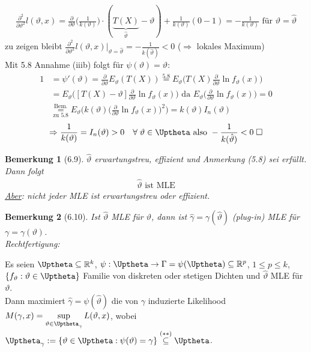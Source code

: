 \documentclass[a4paper,openany]{book}
\theoremstyle{mytheoremstyle}
\newtheorem*{bem}{Bemerkung}
\theoremstyle{mytheoremstyle2}
\newtheorem*{cbew}{Beweis}
\newenvironment{bew}[1][]{%
  \ifthenelse{\boolean{showbew}}{%
    \begin{cbew}[#1]%
  }{%
    \expandafter\comment%
  }%
}{%
  \ifthenelse{\boolean{showbew}}{%
    \end{cbew}%
  }{%
    \expandafter\endcomment%
  }%
}
\begin{document}
\begin{bew}[]
\begin{align*}
    \frac{\partial ^2}{\partial \vartheta ^2}l(\vartheta ,x)=\frac{\partial }{\partial \vartheta }\bigg(\frac{1}{k(\vartheta )}\bigg)\cdot (\underbrace{T(X)}_{\hat{\vartheta }}-\vartheta )+\frac{1}{k(\vartheta )}(0-1)=-\frac{1}{k(\vartheta )}  \text{ für }\vartheta =\hat{\vartheta }
  \end{align*}
  zu zeigen bleibt $\frac{\partial ^2}{\partial \vartheta ^2}l(\vartheta ,x)\bigg|_{\vartheta =\hat{\vartheta }}=-\frac{1}{k(\hat{\vartheta })}<0 $ ($\Rightarrow  $ lokales Maximum) \\
  Mit 5.8 Annahme (iiib) folgt für $\psi (\vartheta )=\vartheta  $:
  \begin{align*}
    1&=\psi '(\vartheta )=\frac{\partial }{\partial \vartheta }E _{\vartheta }(T(X))\overset{5.8}=E _{\vartheta }\bigg(T(X)\frac{\partial }{\partial \vartheta }\ln f _{\vartheta }(x)\bigg)\\
     &=E _{\vartheta }\bigg([T(X)-\vartheta ]\frac{\partial }{\partial \vartheta }\ln f _{\vartheta }(x)\bigg)\text{ da }E _{\vartheta }\bigg(\frac{\partial }{\partial \vartheta }\ln f _{\vartheta }(x)\bigg)=0 \\
     &\!\!\!\!\overset{\text{Bem.}}{\underset{\text{zu 5.8}}{=}}E _{\vartheta }\bigg(k(\vartheta )\bigg(\frac{\partial }{\partial \vartheta }\ln f _{\vartheta }(x)\bigg)^2\bigg)=k(\vartheta )I_n(\vartheta )
  \end{align*}
  \begin{align*}
    \Rightarrow \frac{1}{k(\vartheta )}=I _n(\vartheta )>0\quad \forall\;\vartheta \in \Uptheta \text{ also }-\frac{1}{k(\hat{\vartheta })}<0\;\square
  \end{align*}
\end{bew}
\begin{bem}[6.9]
  $\hat{\vartheta }$ erwartungstreu, effizient und Anmerkung (5.8) sei erfüllt. Dann folgt
  \begin{align*}
    \hat{\vartheta } \text{ ist MLE}
  \end{align*}
  \underline{Aber}: nicht jeder MLE ist erwartungstreu oder effizient.
\end{bem}
\begin{bem}[6.10]
  Ist $\hat{\vartheta }$ MLE für $\vartheta $, dann ist $\hat{\gamma }=\gamma (\hat{\vartheta })$ (plug-in) MLE für $\gamma =\gamma (\vartheta )$.  \\
  Rechtfertigung:
\end{bem}
\begin{theo}{6.11}{}
  Es seien $\Uptheta \subseteq \mathbb{R}^{k}$, $\psi :\Uptheta\to \Gamma =\psi (\Uptheta) \subseteq \mathbb{R}^p$, $1 \leq p \leq k$,  $\{f _{\vartheta }:\vartheta  \in  \Uptheta\}$ Familie von diskreten oder stetigen Dichten und $\hat{\vartheta }$ MLE für $\vartheta $.\\
  Dann maximiert $\hat{\gamma }=\psi (\hat{\vartheta })$ die von $\gamma $ induzierte Likelihood $M(\gamma ,x)=\sup\limits _{\vartheta \in \Uptheta _{\gamma }}L(\vartheta ,x)$, wobei \\
  $\Uptheta _{\gamma }:=\{\vartheta \in \Uptheta:\psi (\vartheta )=\gamma \}\overset{(**)}\subseteq \Uptheta $.
\end{theo}
\end{document}
